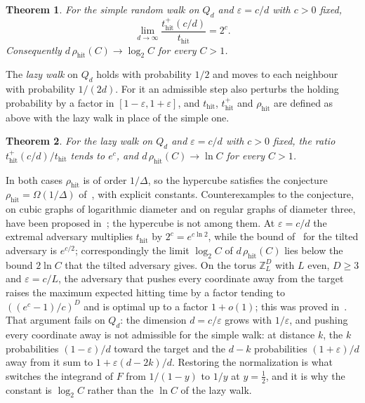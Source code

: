 \documentclass[11pt]{amsart}
\newtheorem{theorem}{Theorem}[section]
\theoremstyle{remark}
\newcommand{\eps}{\varepsilon}
\newcommand{\thit}{t_{\mathrm{hit}}}
\newcommand{\rhit}{\rho_{\mathrm{hit}}}
\begin{document}
\begin{theorem}\label{thm:main}
For the simple random walk on $Q_d$ and $\eps=c/d$ with $c>0$ fixed,
\[
\lim_{d\to\infty}\frac{\thit^+(c/d)}{\thit}=2^{c}.
\]
Consequently $d\,\rhit(C)\to\log_2 C$ for every $C>1$.
\end{theorem}

The \emph{lazy walk} on $Q_d$ holds with probability $1/2$ and moves to each neighbour with probability $1/(2d)$. For
it an admissible step also perturbs the holding probability by a factor in $[1-\eps,1+\eps]$, and $\thit$, $\thit^+$
and $\rhit$ are defined as above with the lazy walk in place of the simple one.

\begin{theorem}\label{thm:lazy}
For the lazy walk on $Q_d$ and $\eps=c/d$ with $c>0$
fixed, the ratio $\thit^+(c/d)/\thit$ tends to $e^{c}$, and $d\,\rhit(C)\to\ln C$ for every $C>1$.
\end{theorem}

In both cases $\rhit$ is of order $1/\Delta$, so the hypercube satisfies the conjecture $\rhit=\Omega(1/\Delta)$ of~\cite[Conjecture~1.16]{Zuc26}, with explicit constants. Counterexamples to the conjecture, on cubic graphs of logarithmic diameter and on regular graphs of diameter three, have been proposed in~\cite{Anon26}; the hypercube is not among them. At $\eps=c/d$ the extremal adversary multiplies $\thit$ by $2^c=e^{c\ln2}$,
while the bound of~\cite[Theorem~4.5]{Zuc26} for the tilted adversary is $e^{c/2}$; correspondingly the limit
$\log_2C$ of $d\,\rhit(C)$ lies below the bound $2\ln C$ that the tilted adversary gives. On the torus $\mathbb{Z}_L^D$ with $L$ even, $D\ge3$
and $\eps=c/L$, the adversary that pushes every coordinate away from
the target raises the maximum expected hitting time by a factor tending to $((e^c-1)/c)^D$ and is optimal up to a factor $1+o(1)$; this was proved in~\cite[Theorem~1.1]{ShmTorus}. That argument fails on
$Q_d$: the dimension $d=c/\eps$ grows with $1/\eps$, and pushing every coordinate away is not admissible for the simple walk: at distance
$k$, the $k$ probabilities $(1-\eps)/d$ toward the target and the $d-k$ probabilities $(1+\eps)/d$ away from it sum to
$1+\eps(d-2k)/d$. Restoring the normalization is what switches the integrand of $F$ from $1/(1-y)$ to $1/y$ at
$y=\frac12$, and it is why the constant is $\log_2C$ rather than the $\ln C$ of the lazy walk.
\end{document}
